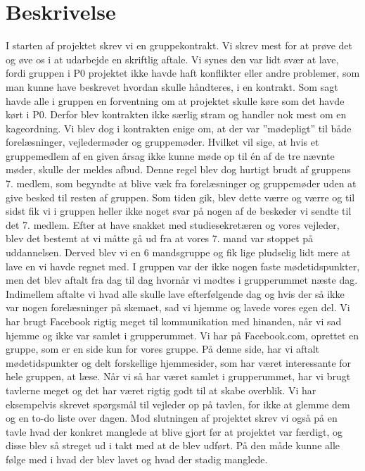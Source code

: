 \section{Beskrivelse}
I starten af projektet skrev vi en gruppekontrakt. Vi skrev mest for at prøve det og øve os i at udarbejde en skriftlig aftale. Vi synes den var lidt svær at lave, fordi gruppen i P0 projektet ikke havde haft konflikter eller andre problemer, som man kunne have beskrevet hvordan skulle håndteres, i en kontrakt. Som sagt havde alle i gruppen en forventning om at projektet skulle køre som det havde kørt i P0. Derfor blev kontrakten ikke særlig stram og handler nok mest om en kageordning. Vi blev dog i kontrakten enige om, at der var ”mødepligt” til både forelæsninger, vejledermøder og gruppemøder. Hvilket vil sige, at hvis et gruppemedlem af en given årsag ikke kunne møde op til én af de tre nævnte møder, skulle der meldes afbud. Denne regel blev dog hurtigt brudt af gruppens 7. medlem, som begyndte at blive væk fra forelæsninger og gruppemøder uden at give besked til resten af gruppen. Som tiden gik, blev dette værre og værre og til sidst fik vi i gruppen heller ikke noget svar på nogen af de beskeder vi sendte til det 7. medlem. Efter at have snakket med studiesekretæren og vores vejleder, blev det bestemt at vi måtte gå ud fra at vores 7. mand var stoppet på uddannelsen. Derved blev vi en 6 mandsgruppe og fik lige pludselig lidt mere at lave en vi havde regnet med.
I gruppen var der ikke nogen faste mødetidspunkter, men det blev aftalt fra dag til dag hvornår vi mødtes i grupperummet næste dag. Indimellem aftalte vi hvad alle skulle lave efterfølgende dag og hvis der så ikke var nogen forelæsninger på skemaet, sad vi hjemme og lavede vores egen del. 
Vi har brugt Facebook rigtig meget til kommunikation med hinanden, når vi sad hjemme og ikke var samlet i grupperummet. Vi har på Facebook.com, oprettet en gruppe, som er en side kun for vores gruppe. På denne side, har vi aftalt mødetidspunkter og delt forskellige hjemmesider, som har været interessante for hele gruppen, at læse. Når vi så har været samlet i grupperummet, har vi brugt tavlerne meget og det har været rigtig godt til at skabe overblik. Vi har eksempelvis skrevet spørgsmål til vejleder op på tavlen, for ikke at glemme dem og en to-do liste over dagen. Mod slutningen af projektet skrev vi også på en tavle hvad der konkret manglede at blive gjort før at projektet var færdigt, og disse blev så streget ud i takt med at de blev udført. På den måde kunne alle følge med i hvad der blev lavet og hvad der stadig manglede. 


